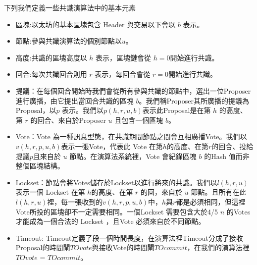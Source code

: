 %
下列我們定義一些共識演算法中的基本元素 
\begin{itemize}%
\item  區塊:以太坊的基本區塊包含 Header 與交易以下會以 $b$ 表示。
\item  節點:參與共識演算法的個別節點以$u$。
\item  高度:共識的區塊高度以 $h$ 表示，區塊鏈會從 $h=0$開始進行共識。
\item  回合:每次共識回合則用 $r$ 表示，每回合會從 $r=0$開始進行共識。
\item  提議：在每個回合開始時我們會從所有參與共識的節點中，選出一位Proposer進行廣播，由它提出當回合共識的區塊 $b$。我們稱Proposer其所廣播的提議為Proposal，以$p$ 表示。我們以$p(h,r,u,b)$表示此Proposal是在第 $h$ 的高度、第 $r$ 的回合、來自於Proposer $u$ 且包含一個區塊 $b$。
\item  Vote：Vote 為一種訊息型態，在共識期間節點之間會互相廣播Vote。我們以 $v(h,r,p,u,b)$表示一張Vote，代表此 Vote 在第$h$的高度、在第$r$的回合、投給提議$p$且來自於 $u$ 節點。在演算法系統裡，Vote 會紀錄區塊 $b$ 的Hash 值而非整個區塊結構。

\item  Lockset：節點會將Votes儲存於Lockset以進行將來的共識。我們以$l(h,r,u)$ 表示一個 Lockset 在第 $h$的高度、在第 $r$ 的回，來自於 $u$ 節點。且所有在此 $l(h,r,u)$裡，每一張收到的$v(h,r,p,u,b)$中，$h$與$r$都是必須相同，但這裡Vote所投的區塊卻不一定需要相同。一個Lockset 需要包含大於4/5 $n$ 的Votes才能成為一個合法的 Lockset ，且Vote 必須來自於不同節點。
\item Timeout: Timeout定義了段一個時間長度，在演算法裡Timeout分成了接收Proposal的時間閘$TOvote$與接收Vote的時間閘$TOcommit$，在我們的演算法裡$TOvote$ = $TOcommit$。 

\end{itemize}